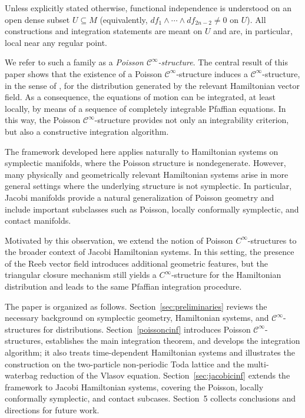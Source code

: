 \documentclass{article}
\theoremstyle{remark}
\theoremstyle{definition}
\newcommand{\cinf}{$\mathcal{C}^{\infty}$}
\begin{document}
Unless explicitly stated otherwise, functional independence is understood on an
open dense subset $U\subseteq M$ (equivalently, $df_1\wedge\cdots\wedge df_{2n-2}\neq 0$
on $U$). All constructions and integration statements are meant on $U$ and are,
in particular, local near any regular point.

We refer to such a family as a \emph{Poisson \cinf-structure}. The central
result of this paper shows that the existence of a Poisson \cinf-structure
induces a \cinf-structure, in the sense of \cite{pancinf-sym}, for the
distribution generated by the relevant Hamiltonian vector field. As a consequence, the
equations of motion can be integrated, at least locally, by means of a sequence of
completely integrable Pfaffian equations. In this way, the Poisson
\cinf-structure provides not only an integrability criterion, but also a
constructive integration algorithm.

The framework developed here applies naturally to Hamiltonian systems on symplectic manifolds, where the Poisson structure is nondegenerate. However, many physically and geometrically relevant Hamiltonian systems arise in more general settings where the underlying structure is not symplectic. In particular, Jacobi manifolds provide a natural generalization of Poisson geometry and include important subclasses such as Poisson, locally conformally symplectic, and contact manifolds.

Motivated by this observation, we extend the notion of Poisson $C^\infty$-structures to the broader context of Jacobi Hamiltonian systems. In this setting, the presence of the Reeb vector field introduces additional geometric features, but the triangular closure mechanism still yields a $C^\infty$-structure for the Hamiltonian distribution and leads to the same Pfaffian integration procedure.

The paper is organized as follows. Section~\ref{sec:preliminaries} reviews the necessary background on symplectic geometry, Hamiltonian systems, and \cinf-structures for distributions. Section~\ref{poissoncinf} introduces Poisson \cinf-structures, establishes the main integration theorem, and develops the integration algorithm; it also treats time-dependent Hamiltonian systems and illustrates the construction on the two-particle non-periodic Toda lattice and the multi-waterbag reduction of the Vlasov equation. Section~\ref{sec:jacobicinf} extends the framework to Jacobi Hamiltonian systems, covering the Poisson, locally conformally symplectic, and contact subcases. Section~5 collects conclusions and directions for future work.
\end{document}
